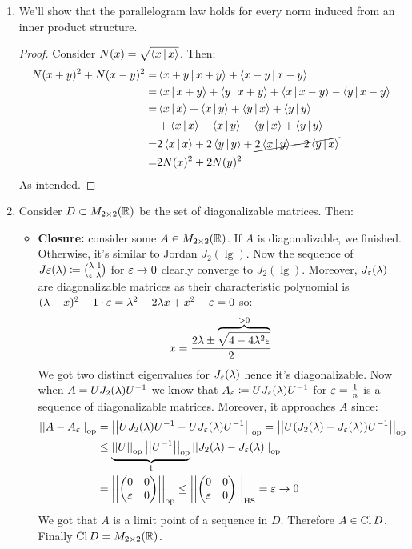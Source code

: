 \documentclass[a4paper]{article}
\newcommand\opn[1]{\norm{#1}_{\mathrm{op}}}
\newcommand\hsn[1]{\norm{#1}_{\mathrm{HS}}}
\begin{document}
\begin{enumerate}
\begin{proof}
			For $u_i = e_i$ it follows from the definition. Otherwise, there exists some unitary matrix $U$ s.t. $Ue_i = u_i$. Now $\norm{Mu_i} = \norm{MUe_i} = \norm{Me_i}$ (as composing by a unitary matrix does not change a vector's norm). This finishes the proof. 
		\end{proof}
		\item We'll show that the parallelogram law holds for every norm induced from an inner product structure. \begin{proof}
			Consider $N(x) = \sqrt{\left \langle x \,\middle|\, x \right \rangle}$. Then: 
			\begin{align*}
				N(x + y)^{2} + N(x - y)^{2} =& \left \langle x + y \,\middle|\, x + y \right \rangle + \left \langle x - y \,\middle|\, x-  y \right \rangle \\
				=& \left \langle x \,\middle|\, x + y \right \rangle + \left \langle y \,\middle|\, x + y \right \rangle + \left \langle x \,\middle|\, x - y \right \rangle - \left \langle y \,\middle|\, x - y \right \rangle \\
				=& \left \langle x \,\middle|\, x \right \rangle + \left \langle x \,\middle|\, y \right \rangle + \left \langle y \,\middle|\, x \right \rangle + \left \langle y \,\middle|\, y \right \rangle \\
				&+ \left \langle x \,\middle|\, x \right \rangle - \left \langle x \,\middle|\, y \right \rangle - \left \langle y \,\middle|\, x \right \rangle + \left \langle y \,\middle|\, y \right \rangle \\
				=& 2\left \langle x \,\middle|\, x \right \rangle + 2\left \langle y \,\middle|\, y \right \rangle + \cancel{2\left \langle x \,\middle|\, y \right \rangle - 2\left \langle y \,\middle|\, x \right \rangle} \\
				=& 2N(x)^{2} + 2N(y)^{2}
			\end{align*}
			As intended. 
		\end{proof}
		\item Consider $D \subset M_{2 \times 2}(\mathbb{R})$ be the set of diagonalizable matrices. Then: 
		\begin{itemize}
			\item \textbf{Closure: }consider some $A \in M_{2 \times 2}(\mathbb{R})$. If $A$ is diagonalizable, we finished. Otherwise, it's similar to Jordan $J_2(\lg)$. Now the sequence of $J{\eg}(\lg) \cod \binom{\lg\,\,1}{\eg\,\,\lg}$ for $\eg \to 0$ clearly converge to $J_2(\lg)$. Moreover, $J_\eg(\lg)$ are diagonalizable matrices as their characteristic polynomial is $(\lg - x)^{2} - 1 \cdot \eg = \lg^{2} - 2\lg x + x^{2} + \eg = 0$ so: 
			\[ x = \frac{2\lg\pm\overbrace{\sqrt{4 - 4\lg^{2}\eg}}^{> 0}}{2} \]
			We got two distinct eigenvalues for $J_\eg(\lg)$ hence it's diagonalizable. Now when $A = UJ_2(\lambda)U^{-1}$ we know that $A_\eg \cod UJ_\eg(\lg)U\op$ for $\eg = \frac{1}{n}$ is a sequence of diagonalizable matrices. Moreover, it approaches $A$ since: 
			\begin{align*}
				\opn{A - A_\eg} &= \opn{UJ_2(\lg)U\op - UJ_\eg(\lg) U\op} = \opn{U(J_2(\lg) - J_\eg(\lg))U\op} \\
				&\le \underbrace{\opn{U}\opn{U\op}}_{1}\opn{J_2(\lg) - J_\eg(\lg)} \\
				&= \opn{\pms{0 & 0 \\ \eg & 0}} \le \hsn{\pms{0 & 0 \\ \eg & 0}} = \eg \to 0
			\end{align*}
			We got that $A$ is a limit point of a sequence in $D$. Therefore $A \in \operatorname{Cl} D$. Finally $\operatorname{Cl} D = M_{2 \times 2}{(\mathbb{R})}$. 
			

\end{itemize}
\end{enumerate}
\end{document}
